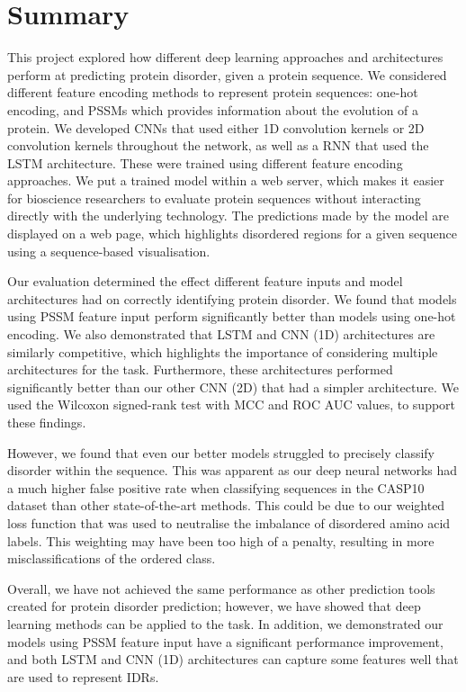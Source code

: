 \documentclass{l4proj}
\begin{document}
\section{Summary}

This project explored how different deep learning approaches and architectures perform at predicting protein disorder, given a protein sequence. We considered different feature encoding methods to represent protein sequences: one-hot encoding, and PSSMs which provides information about the evolution of a protein. We developed CNNs that used either 1D convolution kernels or 2D convolution kernels throughout the network, as well as a RNN that used the LSTM architecture. These were trained using different feature encoding approaches. We put a trained model within a web server, which makes it easier for bioscience researchers to evaluate protein sequences without interacting directly with the underlying technology. The predictions made by the model are displayed on a web page, which highlights disordered regions for a given sequence using a sequence-based visualisation.

Our evaluation determined the effect different feature inputs and model architectures had on correctly identifying protein disorder. We found that models using PSSM feature input perform significantly better than models using one-hot encoding. We also demonstrated that LSTM and CNN (1D) architectures are similarly competitive, which highlights the importance of considering multiple architectures for the task. Furthermore, these architectures performed significantly better than our other CNN (2D) that had a simpler architecture. We used the Wilcoxon signed-rank test with MCC and ROC AUC values, to support these findings.

However, we found that even our better models struggled to precisely classify disorder within the sequence. This was apparent as our deep neural networks had a much higher false positive rate when classifying sequences in the CASP10 dataset than other state-of-the-art methods. This could be due to our weighted loss function that was used to neutralise the imbalance of disordered amino acid labels. This weighting may have been too high of a penalty, resulting in more misclassifications of the ordered class.

Overall, we have not achieved the same performance as other prediction tools created for protein disorder prediction; however, we have showed that deep learning methods can be applied to the task. In addition, we demonstrated our models using PSSM feature input have a significant performance improvement, and both LSTM and CNN (1D) architectures can capture some features well that are used to represent IDRs.
\end{document}
